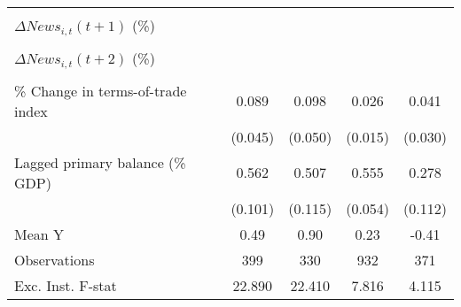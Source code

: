 {\begin{tabular}{l*{4}{c}}
                    &                     &                     &                     &                     \\
\addlinespace
$ \Delta News_{i,t}(t+1)$ (\%)&                     &                     &                     &                     \\
                    &                     &                     &                     &                     \\
\addlinespace
$ \Delta News_{i,t}(t+2)$ (\%)&                     &                     &                     &                     \\
                    &                     &                     &                     &                     \\
\addlinespace
\% Change in terms-of-trade index&       0.089\sym{**} &       0.098\sym{**} &       0.026\sym{*}  &       0.041         \\
                    &     (0.045)         &     (0.050)         &     (0.015)         &     (0.030)         \\
\addlinespace
Lagged primary balance (\% GDP)&       0.562\sym{***}&       0.507\sym{***}&       0.555\sym{***}&       0.278\sym{**} \\
                    &     (0.101)         &     (0.115)         &     (0.054)         &     (0.112)         \\
\midrule
Mean Y              &        0.49         &        0.90         &        0.23         &       -0.41         \\
Observations        &         399         &         330         &         932         &         371         \\
Exc. Inst. F-stat   &      22.890         &      22.410         &       7.816         &       4.115         \\
\bottomrule
\end{tabular}
}
